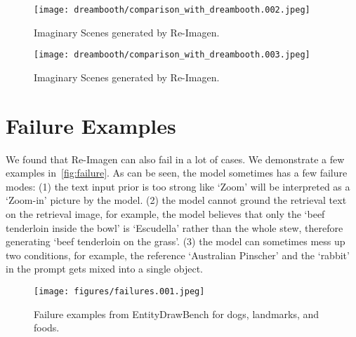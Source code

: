 \documentclass{article} \usepackage{iclr2023_conference,times}
\newcommand{\modelname}{{Re-Imagen}\xspace}
\begin{document}
\begin{figure}[!h]
    \centering
    \texttt{[image: dreambooth/comparison\_with\_dreambooth.002.jpeg]}
    \caption{Imaginary Scenes generated by \modelname. }
    \vspace{-1ex}
    \label{fig:dreambooth2}
\end{figure}
\begin{figure}[!h]
    \centering
    \texttt{[image: dreambooth/comparison\_with\_dreambooth.003.jpeg]}
    \caption{Imaginary Scenes generated by \modelname. }
    \vspace{-1ex}
    \label{fig:dreambooth3}
\end{figure}

\clearpage
\section{Failure Examples}
We found that \modelname can also fail in a lot of cases.  We demonstrate a few examples in~\autoref{fig:failure}. As can be seen, the model sometimes has a few failure modes: (1) the text input prior is too strong like `Zoom' will be interpreted as a `Zoom-in' picture by the model. (2) the model cannot ground the retrieval text on the retrieval image, for example, the model believes that only the `beef tenderloin inside the bowl' is `Escudella' rather than the whole stew, therefore generating `beef tenderloin on the grass'. (3) the model can sometimes mess up two conditions, for example, the reference `Australian Pinscher' and the `rabbit' in the prompt gets mixed into a single object. 

\begin{figure}[!h]
    \centering
    \texttt{[image: figures/failures.001.jpeg]}
    \caption{Failure examples from EntityDrawBench for dogs, landmarks, and foods. }
    \label{fig:failure}
\end{figure}
\end{document}
